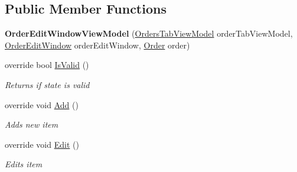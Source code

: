 \subsection*{Public Member Functions}
\begin{DoxyCompactItemize}
\item 
\hypertarget{class_baudi_1_1_client_1_1_view_models_1_1_edit_window_view_models_1_1_order_edit_window_view_model_a5a29a8f7e8f2bc00c94ec10925692f43}{}{\bfseries Order\+Edit\+Window\+View\+Model} (\hyperlink{class_baudi_1_1_client_1_1_view_models_1_1_tabs_view_models_1_1_orders_tab_view_model}{Orders\+Tab\+View\+Model} order\+Tab\+View\+Model, \hyperlink{class_baudi_1_1_client_1_1_view_1_1_edit_windows_1_1_order_edit_window}{Order\+Edit\+Window} order\+Edit\+Window, \hyperlink{class_baudi_1_1_d_a_l_1_1_models_1_1_order}{Order} order)\label{class_baudi_1_1_client_1_1_view_models_1_1_edit_window_view_models_1_1_order_edit_window_view_model_a5a29a8f7e8f2bc00c94ec10925692f43}

\item 
override bool \hyperlink{class_baudi_1_1_client_1_1_view_models_1_1_edit_window_view_models_1_1_order_edit_window_view_model_ade8351d2753ab70dc1084117dc3ae177}{Is\+Valid} ()
\begin{DoxyCompactList}\small\item\em Returns if state is valid \end{DoxyCompactList}\item 
override void \hyperlink{class_baudi_1_1_client_1_1_view_models_1_1_edit_window_view_models_1_1_order_edit_window_view_model_afab00da6d75bb4ad17e508ad795fda6d}{Add} ()
\begin{DoxyCompactList}\small\item\em Adds new item \end{DoxyCompactList}\item 
override void \hyperlink{class_baudi_1_1_client_1_1_view_models_1_1_edit_window_view_models_1_1_order_edit_window_view_model_a52ab30c89b4cb925219a204a115f7acc}{Edit} ()
\begin{DoxyCompactList}\small\item\em Edits item \end{DoxyCompactList}\end{DoxyCompactItemize}

